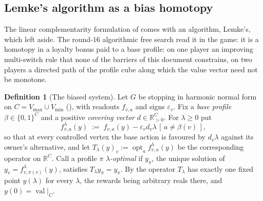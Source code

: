 \documentclass[11pt]{article}
\theoremstyle{plain}
\theoremstyle{definition}
\newtheorem{definition}[theorem]{Definition}
\DeclareMathOperator{\val}{val}
\newcommand{\Vmax}{V_{\max}}
\newcommand{\Vmin}{V_{\min}}
\begin{document}
\subsection{Lemke's algorithm as a bias homotopy}\label{sec:bias}

The linear complementarity formulation of  comes with an
algorithm, Lemke's, which  left aside. The round-$16$
algorithmic free search read it in the game: it is a homotopy in a
loyalty bonus paid to a base profile: on one player an improving
multi-switch rule that none of the barriers of this document constrains,
on two players a directed path of the profile cube along which the value
vector need not be monotone.

\begin{definition}[The biased system]\label{def:bias}
Let $G$ be stopping in harmonic normal form on $C=\Vmax\cup\Vmin$
(), with readouts $f_{v,a}$ and signs
$\varepsilon_v$. Fix a \emph{base profile} $\beta\in\{0,1\}^{C}$ and a
positive \emph{covering vector} $d\in\mathbb R^{C}_{>0}$. For $\lambda\ge0$
put
\[
  f^{\lambda}_{v,a}(y)\;:=\;f_{v,a}(y)-\varepsilon_v d_v\lambda\,
     [\,a\ne\beta(v)\,],
\]
so that at every controlled vertex the base action is favoured by $d_v\lambda$
against its owner's alternative, and let
$T_\lambda(y)_v:=\operatorname{opt}_a f^{\lambda}_{v,a}(y)$ be the
corresponding operator on $\mathbb R^{C}$. Call a profile $\pi$
\emph{$\lambda$-optimal} if $y_\pi$, the unique solution of
$y_v=f^{\lambda}_{v,\pi(v)}(y)$, satisfies $T_\lambda y_\pi=y_\pi$.
By  the operator $T_\lambda$ has exactly one
fixed point $y(\lambda)$ for every $\lambda$, the rewards being arbitrary
reals there, and $y(0)=\val|_C$.
\end{definition}
\end{document}
